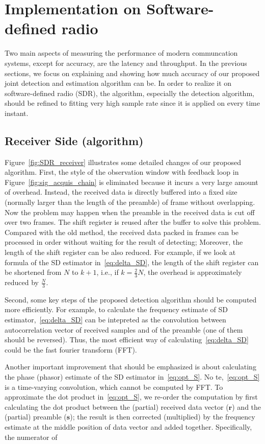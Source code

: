 \section{Implementation on Software-defined radio}
\label{sec:real_implementation}

Two main aspects of measuring the performance of modern communcation systems, except for accuracy,
are the latency and throughput. In the previous sections, we focus on explaining and showing
how much accuracy of our proposed joint detection and estimation algorithm can be.
In order to realize it on software-defined radio (SDR), the algorithm, especially the detection algorithm, should be refined
to fitting very high sample rate since it is applied on every time instant.

\subsection{Receiver Side (algorithm)}

Figure~\ref{fig:SDR_receiver} illustrates some detailed changes of our proposed algorithm.
First, the style of the observation window with feedback loop in Figure~\ref{fig:sig_acquis_chain} is eliminated
because it incurs a very large amount of overhead. Instead, the received data is directly buffered into 
a fixed size (normally larger than the length of the preamble) of frame without overlapping. Now
the problem may happen when the preamble in the received data is cut off over two frames. 
The shift register is reused after the buffer to solve this problem. Compared with the old method, the received data packed in frames can be processed in order without
waiting for the result of detecting; Moreover, the length of the shift register can be also reduced. 
For example, if we look at formula of the SD estimator in~\eqref{eq:delta_SD}, the length of the shift register can be shortened from $N$ to $k+1$,
i.e., if $k=\frac{2}{3}N$, the overhead is approximately reduced by $\frac{N}{3}$.

Second, some key steps of the proposed detection algorithm should be computed more efficiently.
For example, to calculate the frequency estimate of SD estimator,~\eqref{eq:delta_SD} can be intepreted as the convolution between autocorrelation vector of received samples and of the preamble (one of them should be reversed). 
Thus, the most efficient way of calculating~\eqref{eq:delta_SD} could be the fast fourier transform (FFT). 

Another important improvement that should be emphasized is about calculating the phase (phasor) estimate
of the SD estimator in~\eqref{eq:opt_S}. No
te,~\eqref{eq:opt_S} is a time-varying convolution, which cannot be computed by FFT.
To approximate the dot product in~\eqref{eq:opt_S}, we re-order the computation by first calculating the dot product between the (partial) received data vector ($\bm{r}$) and the (partial) preamble ($\bm{s}$);
the result is then corrected (multiplied) by the frequency estimate at the middle position of data vector and added together. Specifically, the numerator of

